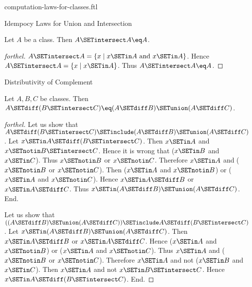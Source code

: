 \documentclass{naproche-library}
\begin{document}
\begin{smodule}[title=Computation Laws For Classes]{computation-laws-for-classes.ftl}
\begin{sfragment}{Idempocy Laws for Union and Intersection}
  \begin{proposition}[forthel,id=FOUNDATIONS_02_4053144145231872]
    Let $A$ be a class.
    Then $A \SETintersect A \eq A$.
  \end{proposition}
  \begin{proof}[forthel]
    $A \SETintersect A = \{ x \mid x \SETin A\text{ and }x \SETin A \}$.
    Hence $A \SETintersect A = \{ x \mid x \SETin A \}$.
    Thus $A \SETintersect A \eq A$.
  \end{proof}
\end{sfragment}

\begin{sfragment}{Distributivity of Complement}
  \begin{proposition}[forthel,id=FOUNDATIONS_02_5296031436636160]
    Let $A, B, C$ be classes.
    Then $A \SETdiff (B \SETintersect C) \eq (A \SETdiff B) \SETunion (A \SETdiff C)$.
  \end{proposition}
  \begin{proof}[forthel]
    Let us show that $A \SETdiff (B \SETintersect C) \SETinclude (A \SETdiff B) \SETunion (A \SETdiff C)$.
      Let $x \SETin A \SETdiff (B \SETintersect C)$.
      Then $x \SETin A$ and $x \SETnotin B \SETintersect C$.
      Hence it is wrong that ($x \SETin B$ and $x \SETin C$).
      Thus $x \SETnotin B$ or $x \SETnotin C$.
      Therefore $x \SETin A$ and ($x \SETnotin B$ or $x \SETnotin C$).
      Then ($x \SETin A$ and $x \SETnotin B$) or ($x \SETin A$ and $x \SETnotin C$).
      Hence $x \SETin A \SETdiff B$ or $x \SETin A \SETdiff C$.
      Thus $x \SETin (A \SETdiff B) \SETunion (A \SETdiff C)$.
    End.

    Let us show that $((A \SETdiff B) \SETunion (A \SETdiff C)) \SETinclude A \SETdiff (B \SETintersect C)$. %
      Let $x \SETin (A \SETdiff B) \SETunion (A \SETdiff C)$.
      Then $x \SETin A \SETdiff B$ or $x \SETin A \SETdiff C$.
      Hence ($x \SETin A$ and $x \SETnotin B$) or ($x \SETin A$ and $x \SETnotin C$).
      Thus $x \SETin A$ and ($x \SETnotin B$ or $x \SETnotin C$).
      Therefore $x \SETin A$ and not ($x \SETin B$ and $x \SETin C$).
      Then $x \SETin A$ and not $x \SETin B \SETintersect C$.
      Hence $x \SETin A \SETdiff (B \SETintersect C)$.
    End.
  \end{proof}


\end{sfragment}
\end{smodule}
\end{document}
